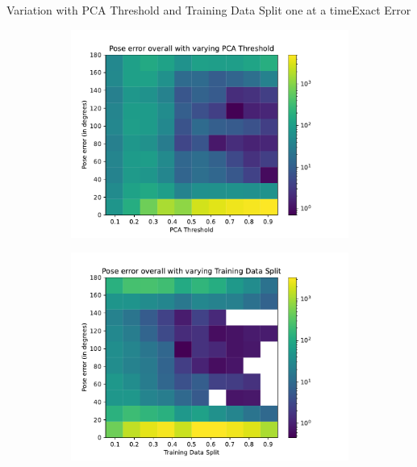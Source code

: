 \documentclass[aspectratio=169, handout, 10pt, hyperref=colorlinks]{beamer}
\begin{document}
\begin{frame}{Variation with PCA Threshold and Training Data Split one at a time}{Exact Error}
    \begin{figure}
        \centering
        \begin{subfigure}{0.48\linewidth}
            \centering
            \includegraphics[width=\linewidth]{pca/error_histogram_overall.pdf}
        \end{subfigure}
        \begin{subfigure}{0.48\linewidth}
            \centering
            \includegraphics[width=\linewidth]{tds/error_histogram_overall.pdf}
        \end{subfigure}
    \end{figure}
\end{frame}
\end{document}
